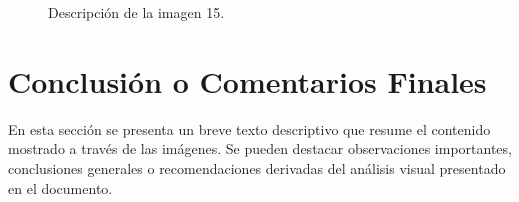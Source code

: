 \documentclass[12pt]{article}
\begin{document}
	\clearpage
	
	\begin{figure}[H]
		\centering
		
		\caption{Descripción de la imagen 15.}
	\end{figure}
	
	\clearpage
	
	\section{Conclusión o Comentarios Finales}
	
	En esta sección se presenta un breve texto descriptivo que resume el contenido 
	mostrado a través de las imágenes. Se pueden destacar observaciones importantes, 
	conclusiones generales o recomendaciones derivadas del análisis visual presentado 
	en el documento.
	
\end{document}
